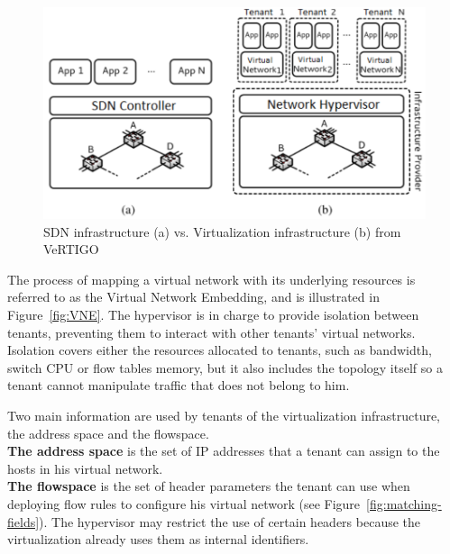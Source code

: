 \begin{figure}[ht]
    \centering
    \includegraphics[scale=0.9]{figures/virt-archi.pdf}
    \caption{SDN infrastructure (a) vs. Virtualization infrastructure (b) from VeRTIGO~\cite{VeRTIGO-Corin2012a}}
    \label{fig:virt-archi}
\end{figure}


The process of mapping a virtual network with its underlying resources is referred to as the Virtual Network Embedding, and is illustrated in Figure~\ref{fig:VNE}.
The hypervisor is in charge to provide isolation between tenants, preventing them to interact with other tenants' virtual networks. Isolation covers either the resources allocated to tenants, such as bandwidth, switch CPU or flow tables memory, but it also includes the topology itself so a tenant cannot manipulate traffic that does not belong to him.

Two main information are used by tenants of the virtualization infrastructure, the address space and the flowspace.\\
\textbf{The address space} is the set of IP addresses that a tenant can assign to the hosts in his virtual network.\\
\textbf{The flowspace} is the set of header parameters the tenant can use when deploying flow rules to configure his virtual network (see Figure~\ref{fig:matching-fields}). The hypervisor may restrict the use of certain headers because the virtualization already uses them as internal identifiers.

